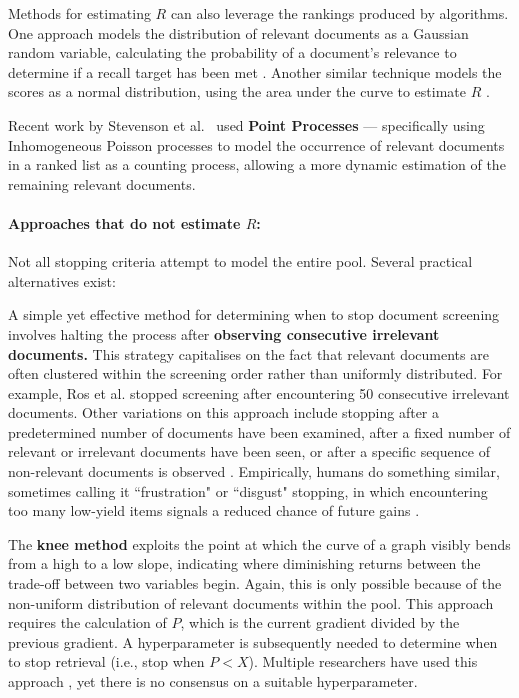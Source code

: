 \documentclass[10pt,oneside]{book}
\begin{document}
Methods for estimating $R$ can also leverage the rankings produced by algorithms.  One approach models the distribution of relevant documents as a Gaussian random variable, calculating the probability of a document's relevance to determine if a recall target has been met \cite{hollmann_ranking_2017}. Another similar technique models the scores as a normal distribution, using the area under the curve to estimate $R$ \cite{cormack_machine_2009}.

Recent work by Stevenson et al.~\cite{stevenson_stopping_2023} used \textbf{Point Processes} — specifically using Inhomogeneous Poisson processes to model the occurrence of relevant documents in a ranked list as a counting process, allowing a more dynamic estimation of the remaining relevant documents. 

\paragraph{Approaches that do not estimate $R$:}
Not all stopping criteria attempt to model the entire pool. Several practical alternatives exist:

A simple yet effective method for determining when to stop document screening involves halting the process after \textbf{ observing consecutive irrelevant documents.}  This strategy capitalises on the fact that relevant documents are often clustered within the screening order rather than uniformly distributed.  For example, Ros et al.\cite{ros_machine_2017} stopped screening after encountering 50 consecutive irrelevant documents.  Other variations on this approach include stopping after a predetermined number of documents have been examined, after a fixed number of relevant or irrelevant documents have been seen, or after a specific sequence of non-relevant documents is observed \cite{losada_when_2019}. Empirically, humans do something similar, sometimes calling it ``frustration" or ``disgust" stopping, in which encountering too many low-yield items signals a reduced chance of future gains \cite{cooper_selecting_1973, kraft_stopping_1979, ilani_analysis_2024}.

The \textbf{knee method} exploits the point at which the curve of a graph visibly bends from a high to a low slope, indicating where diminishing returns between the trade-off between two variables begin. Again, this is only possible because of the non-uniform distribution of relevant documents within the pool. This approach requires the calculation of $P$, which is the current gradient divided by the previous gradient. A hyperparameter is subsequently needed to determine when to stop retrieval (i.e., stop when $P < X$). Multiple researchers have used this approach \cite{cormack_engineering_2016, li_when_2020}, yet there is no consensus on a suitable hyperparameter.  
\end{document}
